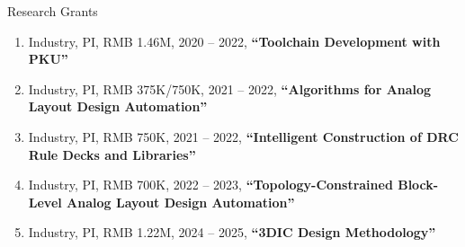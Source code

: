 \begin{rSection}{Research Grants}
\begin{enumerate}[font=\normalfont]
\item Industry, PI, RMB 1.46M, 2020 -- 2022, \textbf{``Toolchain Development with PKU''}

\item Industry, PI, RMB 375K/750K, 2021 -- 2022, \textbf{``Algorithms for Analog Layout Design Automation''}

\item Industry, PI, RMB 750K, 2021 -- 2022, \textbf{``Intelligent Construction of DRC Rule Decks and Libraries''}

\item Industry, PI, RMB 700K, 2022 -- 2023, \textbf{``Topology-Constrained Block-Level Analog Layout Design Automation''}

\item Industry, PI, RMB 1.22M, 2024 -- 2025, \textbf{``3DIC Design Methodology''}

\end{enumerate}

\end{rSection}
